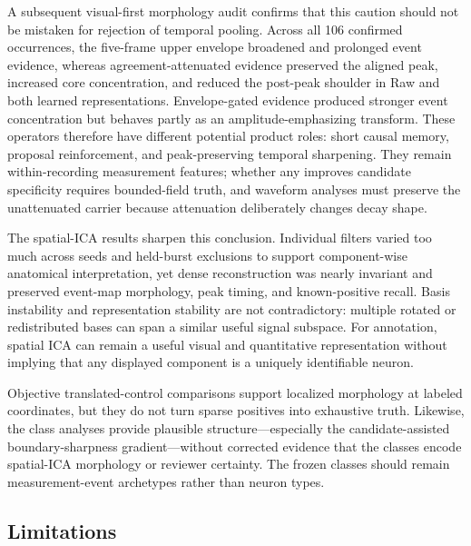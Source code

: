 A subsequent visual-first morphology audit confirms that this caution should
not be mistaken for rejection of temporal pooling. Across all 106 confirmed
occurrences, the five-frame upper envelope broadened and prolonged event
evidence, whereas agreement-attenuated evidence preserved the aligned peak,
increased core concentration, and reduced the post-peak shoulder in Raw and
both learned representations. Envelope-gated evidence produced stronger event
concentration but behaves partly as an amplitude-emphasizing transform. These
operators therefore have different potential product roles: short causal
memory, proposal reinforcement, and peak-preserving temporal sharpening. They
remain within-recording measurement features; whether any improves candidate
specificity requires bounded-field truth, and waveform analyses must preserve
the unattenuated carrier because attenuation deliberately changes decay shape.

The spatial-ICA results sharpen this conclusion. Individual filters varied too much across seeds and held-burst exclusions to support component-wise anatomical interpretation, yet dense reconstruction was nearly invariant and preserved event-map morphology, peak timing, and known-positive recall. Basis instability and representation stability are not contradictory: multiple rotated or redistributed bases can span a similar useful signal subspace. For annotation, spatial ICA can remain a useful visual and quantitative representation without implying that any displayed component is a uniquely identifiable neuron.

Objective translated-control comparisons support localized morphology at labeled coordinates, but they do not turn sparse positives into exhaustive truth. Likewise, the class analyses provide plausible structure---especially the candidate-assisted boundary-sharpness gradient---without corrected evidence that the classes encode spatial-ICA morphology or reviewer certainty. The frozen classes should remain measurement-event archetypes rather than neuron types.

\subsection{Limitations}

